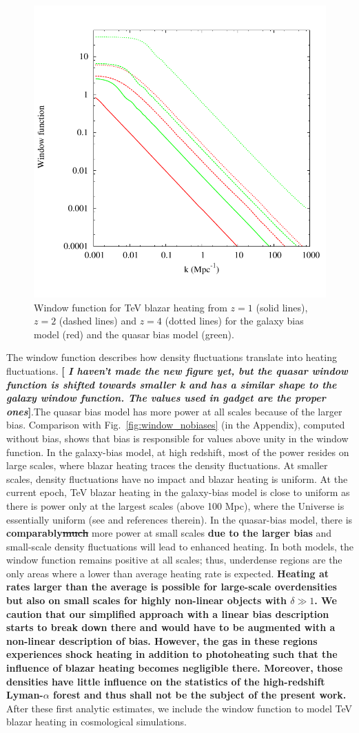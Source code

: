 \documentclass[numberedappendix]{emulateapj}
\newcommand\ALc[1]{{\color{red} \bf #1}} %
\newcommand\Cc[1]{{\color{blue} \bf #1}} %
\begin{document}
\begin{figure}[h]
\centering
\includegraphics[width = .45\textwidth ]{window_gal_qso}
\caption{Window function for TeV blazar heating from $z=1$ (solid lines), $z=2$ (dashed lines) and $z=4$ (dotted lines) for the galaxy bias model (red) and the quasar bias model (green).}
\label{fig:window}
\end{figure}
The window function describes how density fluctuations translate into heating fluctuations. \ALc{[{ \em I haven't made the new figure yet, but the quasar window function is shifted towards smaller k and has a similar shape to the galaxy window function. The values used in gadget are the proper ones}]}.The quasar bias model has more power at all scales because of the larger bias. Comparison with Fig.~\ref{fig:window_nobiases} (in the Appendix), computed without bias, shows that bias is responsible for values above unity in the window function. In the galaxy-bias model, at high redshift, most of the power resides on large scales, where blazar heating traces the density fluctuations. At smaller scales, density fluctuations have no impact and blazar heating is uniform. At the current epoch, TeV blazar heating in the galaxy-bias model is close to uniform as there is power only at the largest scales (above 100 Mpc), where the Universe is essentially uniform (see \citet{2013MNRAS.429.2910C} and references therein). In the quasar-bias model, there is \Cc{comparably\sout{much}} more power at small scales \Cc{due to the larger bias} and small-scale density fluctuations will lead to enhanced heating. In both models, the window function remains positive at all scales; thus, underdense regions are the only areas where a lower than average heating rate is expected. \Cc{Heating at rates larger than the average is possible for large-scale overdensities but also on small scales for highly non-linear objects with $\delta\gg1$. We caution that our simplified approach with a linear bias description starts to break down there and would have to be augmented with a non-linear description of bias. However, the gas in these regions experiences shock heating in addition to photoheating such that the influence of blazar heating becomes negligible there. Moreover, those densities have little influence on the statistics of the high-redshift Lyman-$\alpha$ forest and thus shall not be the subject of the present work.} After these first analytic estimates, we include the window function to model TeV blazar heating in cosmological simulations.
\end{document}
